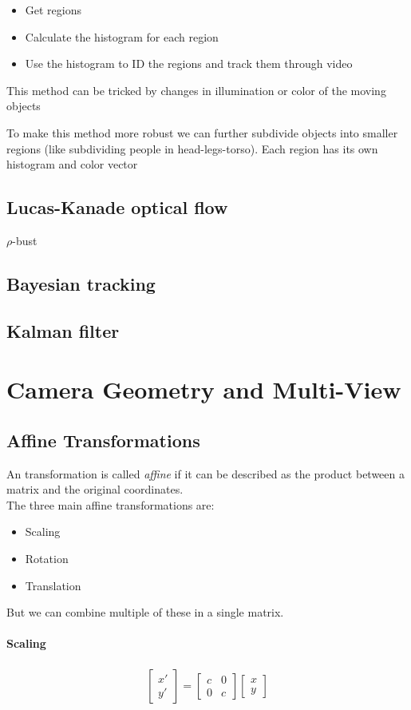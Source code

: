 \documentclass{article}
\begin{document}
\begin{itemize}
    \item Get regions
    \item Calculate the histogram for each region
    \item Use the histogram to ID the regions and track them through video
\end{itemize}
This method can be tricked by changes in illumination or color of the moving objects

To make this method more robust we can further subdivide objects into smaller regions (like subdividing people in head-legs-torso). Each region has its own histogram and color vector

\subsection{Lucas-Kanade optical flow}
$\rho$-bust

\subsection{Bayesian tracking}
\subsection{Kalman filter}

\section{Camera Geometry and Multi-View}
\subsection{Affine Transformations}
An transformation is called \textit{affine} if it can be described as the product between a matrix and the original coordinates.\\
The three main affine transformations are:
\begin{itemize}
    \item Scaling
    \item Rotation
    \item Translation
\end{itemize}
But we can combine multiple of these in a single matrix.

\paragraph{Scaling}
\begin{align*}
    \left[\begin{array}{c}x'\\y'\end{array}\right] = \left[\begin{array}{cc}c & 0 \\ 0 & c\end{array}\right]\left[\begin{array}{c}x\\y\end{array}\right]
\end{align*}
\end{document}
